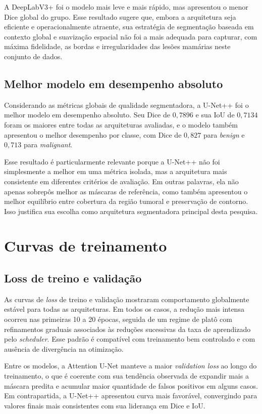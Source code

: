 \documentclass[tcc,capa]{texufpel}
\begin{document}
A DeepLabV3+ foi o modelo mais leve e mais rápido, mas apresentou o menor Dice global do grupo. Esse resultado sugere que, embora a arquitetura seja eficiente e operacionalmente atraente, sua estratégia de segmentação baseada em contexto global e suavização espacial não foi a mais adequada para capturar, com máxima fidelidade, as bordas e irregularidades das lesões mamárias neste conjunto de dados.

\subsection{Melhor modelo em desempenho absoluto}

Considerando as métricas globais de qualidade segmentadora, a U-Net++ foi o melhor modelo em desempenho absoluto. Seu Dice de \(0{,}7896\) e sua IoU de \(0{,}7134\) foram os maiores entre todas as arquiteturas avaliadas, e o modelo também apresentou o melhor desempenho por classe, com Dice de \(0{,}827\) para \textit{benign} e \(0{,}713\) para \textit{malignant}.

Esse resultado é particularmente relevante porque a U-Net++ não foi simplesmente a melhor em uma métrica isolada, mas a arquitetura mais consistente em diferentes critérios de avaliação. Em outras palavras, ela não apenas sobrepôs melhor as máscaras de referência, como também apresentou o melhor equilíbrio entre cobertura da região tumoral e preservação de contorno. Isso justifica sua escolha como arquitetura segmentadora principal desta pesquisa.

\section{Curvas de treinamento}

\subsection{Loss de treino e validação}

As curvas de \textit{loss} de treino e validação mostraram comportamento globalmente estável para todas as arquiteturas. Em todos os casos, a redução mais intensa ocorreu nas primeiras 10 a 20 épocas, seguida de um regime de platô com refinamentos graduais associados às reduções sucessivas da taxa de aprendizado pelo \textit{scheduler}. Esse padrão é compatível com treinamento bem controlado e com ausência de divergência na otimização.

Entre os modelos, a Attention U-Net manteve a maior \textit{validation loss} ao longo do treinamento, o que é coerente com sua tendência observada de expandir mais a máscara predita e acumular maior quantidade de falsos positivos em alguns casos. Em contrapartida, a U-Net++ apresentou curva mais favorável, convergindo para valores finais mais consistentes com sua liderança em Dice e IoU.
\end{document}
